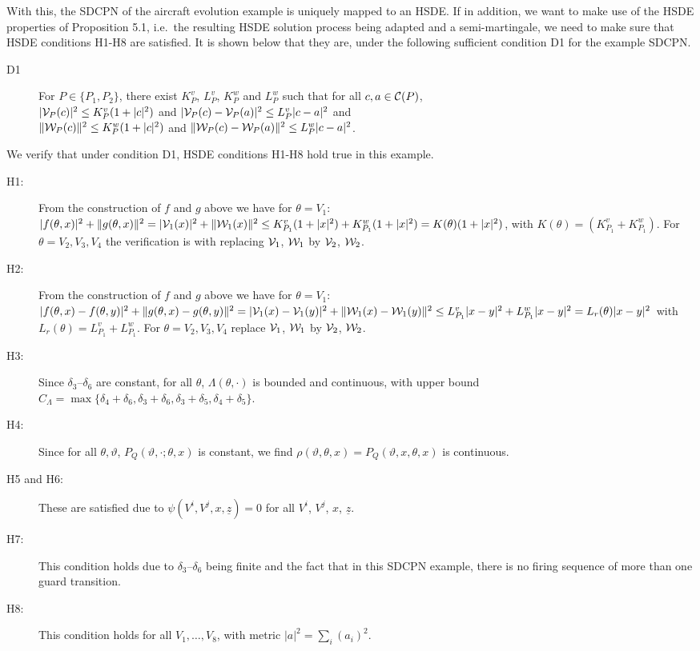 \documentclass[copyright,creativecommons]{eptcs}
\begin{document}
With this, the SDCPN of the aircraft evolution example is uniquely
mapped to an HSDE. If in addition, we want to make use of the HSDE
properties of Proposition 5.1, i.e.\ the
resulting HSDE solution process being adapted and a
semi-martingale, we need to make sure that HSDE conditions H1-H8
are satisfied. It is shown below that they are, under the
following sufficient condition D1 for the example SDCPN.
\begin{description}
\item[D1] For $P\in \{P_1, P_2\}$, there exist $K_P^v$, $L_P^v$,
$K_P^w$
and $L_P^w$ such that for all $c, a \in {\cal C}(P)$,\\
$|{\cal V}_P(c)|^2 \leq K_P^v(1+|c|^2)$ and
$|{\cal V}_P(c) - {\cal V}_P(a)|^2 \leq L_P^v|c-a|^2$ and\\
$\|{\cal W}_P(c)\|^2 \leq K_P^w(1+|c|^2)$ and $\|{\cal W}_P(c) -
{\cal W}_P(a)\|^2 \leq L_P^w|c-a|^2$.
\end{description}
We verify that under condition D1, HSDE conditions H1-H8 hold true
in this example.
\begin{description}
\item[H1:] From the construction of $f$ and $g$ above we have for
$\theta = V_1$: $|f(\theta,x)|^2 + \|g(\theta,x)\|^2 = |{\cal
V}_{1}(x)|^2 + \|{\cal W}_{1}(x) \|^2 \leq  K_{P_1}^v (1+|x|^2) +
K_{P_1}^w (1+|x|^2) =  K(\theta)(1+|x|^2)$, with $K(\theta) =
(K_{P_1}^v+K_{P_1}^w)$. For $\theta = V_2, V_3, V_4$ the
verification is with replacing ${\cal V}_{1}$, ${\cal W}_{1}$ by
${\cal V}_{2}$, ${\cal W}_{2}$.

\item[H2:] From the construction of $f$ and $g$ above we have for
$\theta = V_1$: $| f(\theta,x) - f(\theta,y) |^2 + \| g(\theta,x)
-g(\theta,y) \|^2 = | {\cal V}_{1}(x) - {\cal V}_{1}(y)|^2
  +  \| {\cal W}_{1}(x) - {\cal W}_{1}(y)\|^2
\leq L_{P_1}^v |x-y|^2
 +  L_{P_1}^w |x-y|^2
 =  L_r (\theta) |x-y|^2$
with $L_r (\theta) = L_{P_1}^v+L_{P_1}^w$. For $\theta = V_2, V_3,
V_4$ replace ${\cal V}_{1}$, ${\cal W}_{1}$ by ${\cal V}_{2}$,
${\cal W}_{2}$.

\item[H3:] Since $\delta_3$--$\delta_6$ are constant, for all
$\theta$, $\Lambda(\theta, \cdot)$ is bounded and continuous, with
upper bound $C_{\Lambda} = \max \{ \delta_4 + \delta_6, \delta_3 +
\delta_6, \delta_3 + \delta_5, \delta_4 + \delta_5\}$.

\item[H4:] Since for all $\theta, \vartheta$, $P_Q(\vartheta,
\cdot; \theta, x)$ is constant, we find $\rho(\vartheta, \theta,
x) = P_Q(\vartheta, x, \theta, x)$ is continuous.

\item[H5 and H6:] These are satisfied due to $\psi(V^i, V^j, x,
\underline{z}) = 0$ for all $V^i$, $V^j$, $x$, $\underline{z}$.

\item[H7:] This condition holds due to $\delta_3$--$\delta_6$
being finite and the fact that in this SDCPN example, there is no
firing sequence of more than one guard transition. \item[H8:] This
condition holds for all $V_1, \ldots, V_8$, with metric $|a|^2 =
\sum_i(a_i)^2$.
\end{description}
\end{document}

